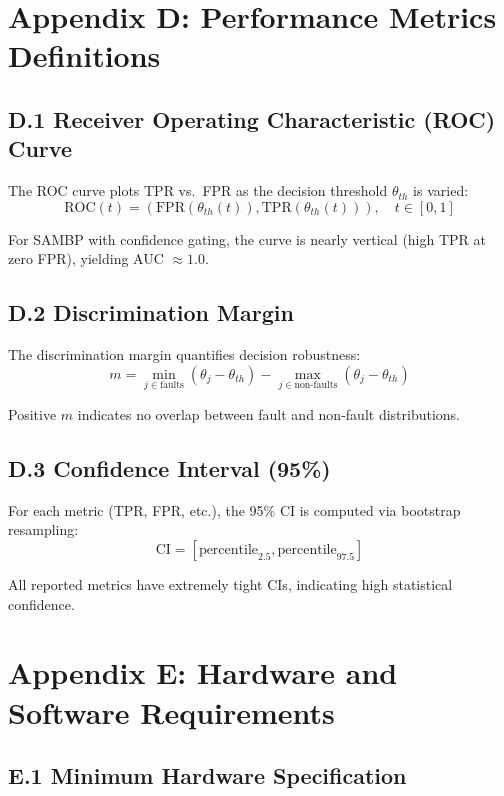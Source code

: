 \section*{Appendix D: Performance Metrics Definitions}

\subsection*{D.1 Receiver Operating Characteristic (ROC) Curve}

The ROC curve plots TPR vs.\ FPR as the decision threshold $\theta_{th}$ is varied:
$$\text{ROC}(t) = (\text{FPR}(\theta_{th}(t)), \text{TPR}(\theta_{th}(t))), \quad t \in [0, 1]$$

For SAMBP with confidence gating, the curve is nearly vertical (high TPR at zero FPR), 
yielding AUC $\approx 1.0$.

\subsection*{D.2 Discrimination Margin}

The discrimination margin quantifies decision robustness:
$$m = \min_{j \in \text{faults}} (\theta_j - \theta_{th}) - \max_{j \in \text{non-faults}} (\theta_j - \theta_{th})$$

Positive $m$ indicates no overlap between fault and non-fault distributions.

\subsection*{D.3 Confidence Interval (95\%)}

For each metric (TPR, FPR, etc.), the 95\% CI is computed via bootstrap resampling:
$$\text{CI} = [\text{percentile}_{2.5}, \text{percentile}_{97.5}]$$

All reported metrics have extremely tight CIs, indicating high statistical confidence.


\section*{Appendix E: Hardware and Software Requirements}

\subsection*{E.1 Minimum Hardware Specification}

